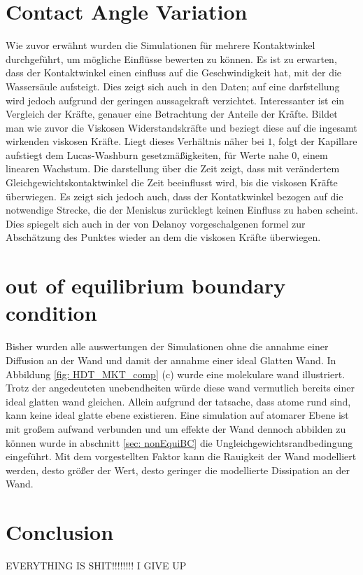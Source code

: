 \section{Contact Angle Variation}
Wie zuvor erwähnt wurden die Simulationen für mehrere Kontaktwinkel durchgeführt, um mögliche Einflüsse bewerten zu können. Es ist zu erwarten, dass der Kontaktwinkel einen einfluss auf die Geschwindigkeit hat, mit der die Wassersäule aufsteigt. Dies zeigt sich auch in den Daten; auf eine darfstellung wird jedoch aufgrund der geringen aussagekraft verzichtet. Interessanter ist ein Vergleich der Kräfte, genauer eine Betrachtung der Anteile der Kräfte. Bildet man wie zuvor die Viskosen Widerstandskräfte und beziegt diese auf die ingesamt wirkenden viskosen Kräfte. Liegt dieses Verhältnis näher bei $1$, folgt der Kapillare aufstiegt dem Lucas-Washburn gesetzmäßigkeiten, für Werte nahe $0$, einem linearen Wachstum. Die darstellung über die Zeit zeigt, dass mit verändertem Gleichgewichtskontaktwinkel die Zeit beeinflusst wird, bis die viskosen Kräfte überwiegen. Es zeigt sich jedoch auch, dass der Kontatkwinkel bezogen auf die notwendige Strecke, die der Meniskus zurücklegt keinen Einfluss zu haben scheint. Dies spiegelt sich auch in der von Delanoy vorgeschalgenen formel zur Abschätzung des Punktes wieder an dem die viskosen Kräfte überwiegen.




\section{out of equilibrium boundary condition}
Bisher wurden alle auswertungen der Simulationen ohne die annahme einer Diffusion an der Wand und damit der annahme einer ideal Glatten Wand. In Abbildung \ref{fig: HDT_MKT_comp} (c) wurde eine molekulare wand illustriert. Trotz der angedeuteten unebendheiten würde diese wand vermutlich bereits einer ideal glatten wand gleichen. Allein aufgrund der tatsache, dass atome rund sind, kann keine ideal glatte ebene existieren. Eine simulation auf atomarer Ebene ist mit großem aufwand verbunden und um effekte der Wand dennoch abbilden zu können wurde in abschnitt \ref{sec: nonEquiBC} die Ungleichgewichtsrandbedingung eingeführt. Mit dem vorgestellten Faktor kann die Rauigkeit der Wand modelliert werden, desto größer der Wert, desto geringer die modellierte Dissipation an der Wand. 



\section{Conclusion}

EVERYTHING IS SHIT!!!!!!!!
I GIVE UP
